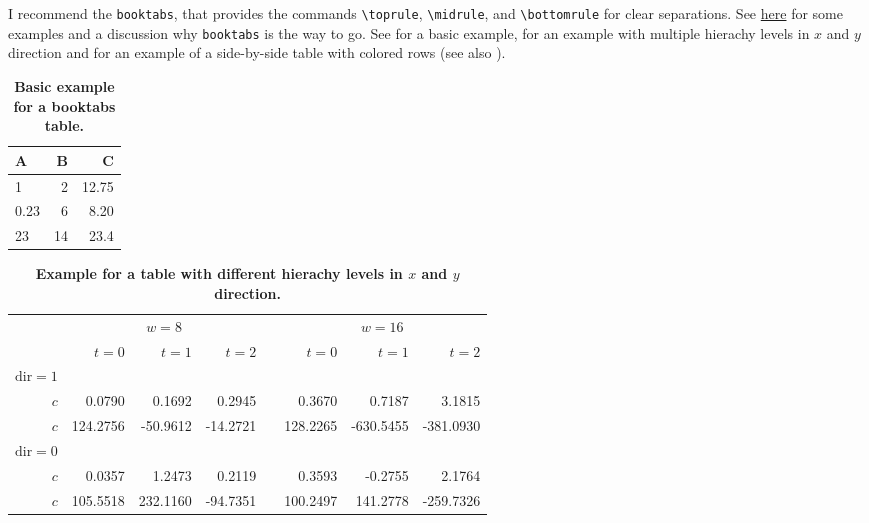 I recommend the \verb|booktabs|, that provides the commands \verb|\toprule|, \verb|\midrule|, and \verb|\bottomrule| for clear separations. See \href{https://nhigham.com/2019/11/19/better-latex-tables-with-booktabs/}{here} for some examples and a discussion why \verb|booktabs| is the way to go. See  for a basic example,  for an example with multiple hierachy levels in $x$ and $y$ direction and  for an example of a side-by-side table with colored rows (see also ).

\begin{table}
\centering 
\caption{\textbf{Basic example for a booktabs table.}}
\label{tab:table1}
\vspace{5ex}
	\begin{tabular}{lrr} 
		\toprule
		A & B & C \\ 
		\midrule 
		1 & 2 & 12.75 \\
		0.23 & 6 & 8.20 \\
		23 & 14 & 23.4\\ 
		\bottomrule
	\end{tabular}
\end{table}

\begin{table}
	\centering
	\caption{\textbf{Example for a table with different hierachy levels in $x$ and $y$ direction.}}
	\label{tab:table2}
	\vspace{5ex}
	\begin{tabular}{@{}rrrrcrrr@{}}\toprule
		& \multicolumn{3}{c}{$w = 8$} & \phantom{abc}& \multicolumn{3}{c}{$w = 16$} \\
		\cmidrule{2-4} \cmidrule{6-8}
		& $t=0$ & $t=1$ & $t=2$ && $t=0$ & $t=1$ & $t=2$\\ 
		\midrule
		$\mathrm{dir}=1$\\
		$c$ & 0.0790 & 0.1692 & 0.2945 && 0.3670 & 0.7187 & 3.1815 \\
		$c$ & 124.2756& -50.9612& -14.2721&& 128.2265& -630.5455& -381.0930\\
		$\mathrm{dir}=0$\\
		$c$ & 0.0357& 1.2473& 0.2119&& 0.3593& -0.2755& 2.1764\\
		$c$ & 105.5518& 232.1160& -94.7351&& 100.2497& 141.2778& -259.7326\\
		\bottomrule
	\end{tabular}

\end{table}

